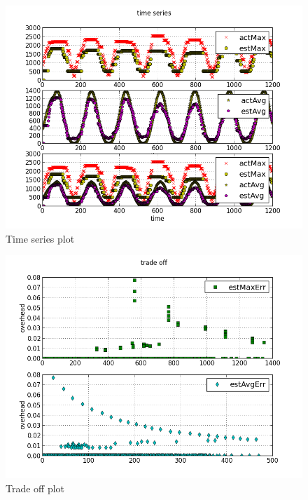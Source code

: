 \documentclass[a4paper, smallheadings,english]{scrartcl}
\begin{document}
\begin{figure}[h!]
    \begin{center}
        \includegraphics[scale=0.7]{plots/time_series}
    \end{center}
    \caption{Time series plot}
    \label{fig:ts}
\end{figure}
\begin{figure}[h!]
    \begin{center}
        \includegraphics[scale=0.7]{plots/trade_off}
    \end{center}
    \caption{Trade off plot}
    \label{fig:to}
\end{figure}
\end{document}

